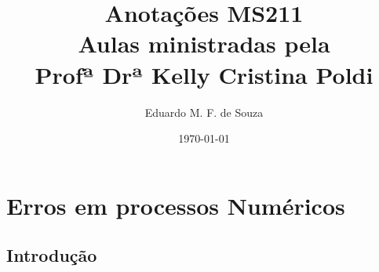 \documentclass{article}
\begin{document}
\title{Anotações MS211\\ \large Aulas ministradas pela\\ Profª Drª Kelly Cristina Poldi}
\author{Eduardo M. F. de Souza}
\date{\today}

\maketitle


\tableofcontents
\newpage

\section{Erros em processos Numéricos}

    \subsection{Introdução}
\end{document}
